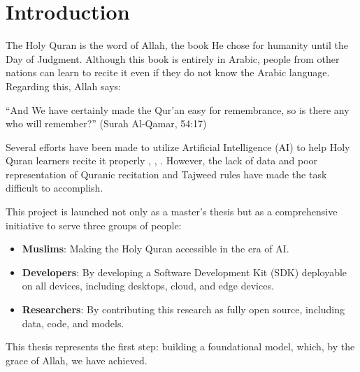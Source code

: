 
\chapter{Introduction} %

\label{Chapter1} %





The Holy Quran is the word of Allah, the book He chose for humanity until the Day of Judgment. Although this book is entirely in Arabic, people from other nations can learn to recite it even if they do not know the Arabic language. Regarding this, Allah says:  

\begin{center}
\end{center}

``And We have certainly made the Qur'an easy for remembrance, so is there any who will remember?'' (Surah Al-Qamar, 54:17)  

Several efforts have been made to utilize Artificial Intelligence (AI) to help Holy Quran learners recite it properly \cite{abdou2014computer}, \cite{al2018computer}, \cite{ahmed2017arabic}. However, the lack of data and poor representation of Quranic recitation and Tajweed rules have made the task difficult to accomplish.

This project is launched not only as a master's thesis but as a comprehensive initiative to serve three groups of people:

\begin{itemize}
\item \textbf{Muslims}: Making the Holy Quran accessible in the era of AI.
\item \textbf{Developers}: By developing a Software Development Kit (SDK) deployable on all devices, including desktops, cloud, and edge devices.
\item \textbf{Researchers}: By contributing this research as fully open source, including data, code, and models.
\end{itemize}

This thesis represents the first step: building a foundational model, which, by the grace of Allah, we have achieved.


